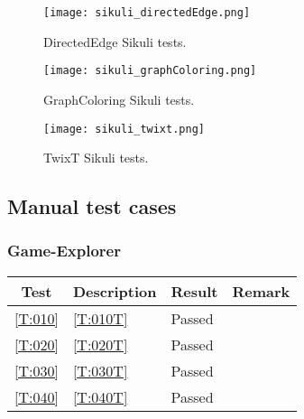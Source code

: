 \begin{figure}[!h]
	\texttt{[image: sikuli\_directedEdge.png]}
	\caption{DirectedEdge Sikuli tests.}
	\label{img:sikuliDirectedEdge}
\end{figure}

\begin{figure}[!h]
	\texttt{[image: sikuli\_graphColoring.png]}
	\caption{GraphColoring Sikuli tests.}
	\label{img:sikuliGraphColoring}
\end{figure}

\begin{figure}[!h]
	\texttt{[image: sikuli\_twixt.png]}
	\caption{TwixT Sikuli tests.}
	\label{img:sikuliTwixt}
\end{figure}

\subsection{Manual test cases}

\subsubsection{Game-Explorer}

\begin{tabular}{clll}
	\hline
	\textbf{Test} & \textbf{Description} & \textbf{Result} & \textbf{Remark} \\
	\hline
	\ref{T:010} & \ref{T:010T} & Passed & \\
	\ref{T:020} & \ref{T:020T} & Passed & \\
	\ref{T:030} & \ref{T:030T} & Passed & \\
	\ref{T:040} & \ref{T:040T} & Passed & \\
	\hline
\end{tabular}

